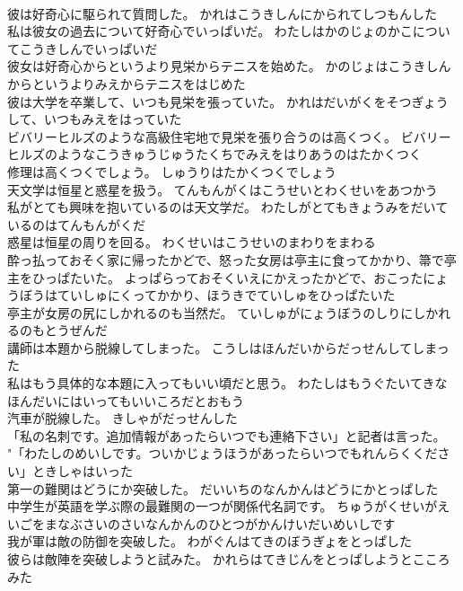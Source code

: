 \documentclass[8pt]{extreport}
\begin{document}
\begin{CJK}{UTF8}{min}
\\	彼は好奇心に駆られて質問した。	かれはこうきしんにかられてしつもんした 
\\	私は彼女の過去について好奇心でいっぱいだ。	わたしはかのじょのかこについてこうきしんでいっぱいだ 
\\	彼女は好奇心からというより見栄からテニスを始めた。	かのじょはこうきしんからというよりみえからテニスをはじめた 
\\	彼は大学を卒業して、いつも見栄を張っていた。	かれはだいがくをそつぎょうして、いつもみえをはっていた 
\\	ビバリーヒルズのような高級住宅地で見栄を張り合うのは高くつく。	ビバリーヒルズのようなこうきゅうじゅうたくちでみえをはりあうのはたかくつく 
\\	修理は高くつくでしょう。	しゅうりはたかくつくでしょう 
\\	天文学は恒星と惑星を扱う。	てんもんがくはこうせいとわくせいをあつかう 
\\	私がとても興味を抱いているのは天文学だ。	わたしがとてもきょうみをだいているのはてんもんがくだ 
\\	惑星は恒星の周りを回る。	わくせいはこうせいのまわりをまわる 
\\	酔っ払っておそく家に帰ったかどで、怒った女房は亭主に食ってかかり、箒で亭主をひっぱたいた。	よっぱらっておそくいえにかえったかどで、おこったにょうぼうはていしゅにくってかかり、ほうきでていしゅをひっぱたいた 
\\	亭主が女房の尻にしかれるのも当然だ。	ていしゅがにょうぼうのしりにしかれるのもとうぜんだ 
\\	講師は本題から脱線してしまった。	こうしはほんだいからだっせんしてしまった 
\\	私はもう具体的な本題に入ってもいい頃だと思う。	わたしはもうぐたいてきなほんだいにはいってもいいころだとおもう 
\\	汽車が脱線した。	きしゃがだっせんした 
\\	「私の名刺です。追加情報があったらいつでも連絡下さい」と記者は言った。	"「わたしのめいしです。ついかじょうほうがあったらいつでもれんらくください」ときしゃはいった 
\\	第一の難関はどうにか突破した。	だいいちのなんかんはどうにかとっぱした 
\\	中学生が英語を学ぶ際の最難関の一つが関係代名詞です。	ちゅうがくせいがえいごをまなぶさいのさいなんかんのひとつがかんけいだいめいしです 
\\	我が軍は敵の防御を突破した。	わがぐんはてきのぼうぎょをとっぱした 
\\	彼らは敵陣を突破しようと試みた。	かれらはてきじんをとっぱしようとこころみた 

\end{CJK}
\end{document}
